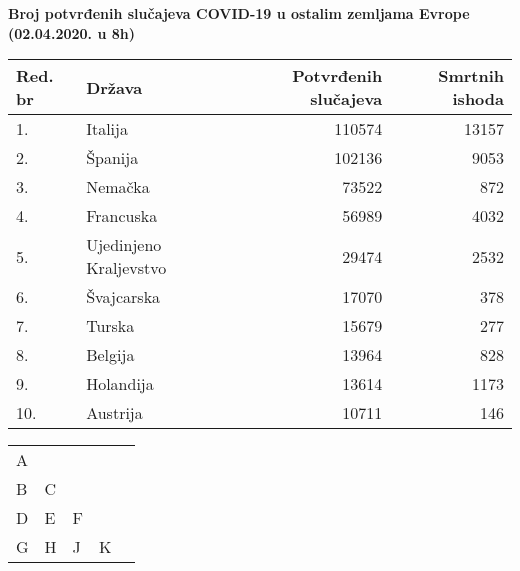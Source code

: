 \documentclass[10pt, a4paper]{article}
\begin{document}
{\bf Broj potvrđenih slučajeva COVID-19 u ostalim zemljama Evrope (02.04.2020. u 8h)}

\begin{tabular}{|l|l|rr|}
    \hline
    Red. br & Država & Potvrđenih slučajeva & Smrtnih ishoda \\
    \hline
    1. & Italija & 110574  & 13157 \\
    2. &	Španija &	102136	& 9053 \\
    3. &	 Nemačka &	73522 &	872 \\
    4. &	Francuska &	56989 &	4032 \\
    5. &	Ujedinjeno Kraljevstvo &	29474 &	2532 \\
    6. &	Švajcarska &	17070 &	378 \\
    7. &	Turska &	15679 &	277 \\
    8. &	Belgija &	13964 &	828 \\
    9. &	Holandija &	13614 &	1173 \\
    10. &	Austrija &	10711 &	146 \\
    \hline
\end{tabular}

\bigskip

\begin{tabular}{|lllll}
    \cline{1-1}
    \multicolumn{1}{|l|}{A} &                        &                        &                        &  \\ \cline{2-2}
    B                       & \multicolumn{1}{l|}{C} &                        &                        &  \\ \cline{3-3}
    D                       & E                      & \multicolumn{1}{l|}{F} &                        &  \\ \cline{4-4}
    G                       & H                      & J                      & \multicolumn{1}{l|}{K} &  \\ \cline{1-4}
\end{tabular}
    
\end{document}
